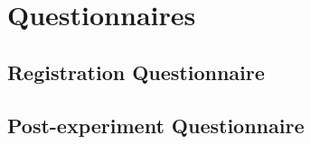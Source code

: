\chapter{Questionnaires}\label{a:questionnaires}

\section{Registration Questionnaire}

\section{Post-experiment Questionnaire}